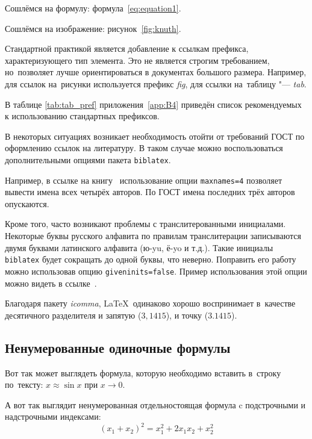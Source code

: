 Сошлёмся на формулу: формула~\cref{eq:equation1}.

Сошлёмся на изображение: рисунок~\cref{fig:knuth}.

Стандартной практикой является добавление к ссылкам префикса, характеризующего тип элемента.
Это не является строгим требованием, но~позволяет лучше ориентироваться в документах большого размера.
Например, для ссылок на~рисунки используется префикс \textit{fig},
для ссылки на~таблицу "--- \textit{tab}.

В таблице \cref{tab:tab_pref} приложения~\cref{app:B4} приведён список рекомендуемых
к использованию стандартных префиксов.

В некоторых ситуациях возникает необходимость отойти от требований ГОСТ по оформлению ссылок на
литературу.
В таком случае можно воспользоваться дополнительными опциями пакета \verb+biblatex+.

Например, в ссылке на книгу~\cite{sobenin_kdv} использование опции \verb+maxnames=4+ позволяет
вывести имена всех четырёх авторов.
По ГОСТ имена последних трёх авторов опускаются.

Кроме того, часто возникают проблемы с транслитерованными инициалами. Некоторые буквы русского
алфавита по правилам транслитерации записываются двумя буквами латинского алфавита (ю-yu, ё-yo и
т.д.).
Такие инициалы \verb+biblatex+ будет сокращать до одной буквы, что неверно.
Поправить его работу можно использовав опцию \verb+giveninits=false+.
Пример использования этой опции можно видеть в ссылке~\cite{initials}.


Благодаря пакету \textit{icomma}, \LaTeX~одинаково хорошо воспринимает
в~качестве десятичного разделителя и запятую (\(3,1415\)), и точку (\(3.1415\)).

\subsection{Ненумерованные одиночные формулы}\label{subsec:ch5/sec1/sub1}

Вот так может выглядеть формула, которую необходимо вставить в~строку
по~тексту: \(x \approx \sin x\) при \(x \to 0\).

А вот так выглядит ненумерованная отдельностоящая формула c подстрочными
и надстрочными индексами:
\[
    (x_1+x_2)^2 = x_1^2 + 2 x_1 x_2 + x_2^2
\]

